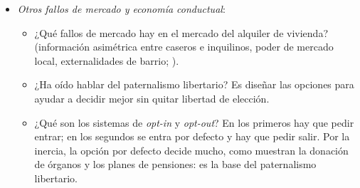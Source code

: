 \documentclass[11pt]{article}
\begin{document}
\begin{itemize}
\begin{itemize}
  \item ¿Por qué la DMA designa a los guardianes con umbrales en lugar de definir mercados?
  \item ¿Qué relación hay entre la regulación y las nuevas tecnologías? (plataformas, datos, DMA).
  \item ¿Cómo se evalúa una regulación? (análisis coste-beneficio e impacto normativo; los 5~criterios de legitimidad del anexo~\ref{anexo:buena-regulacion}) .
  \end{itemize}
\item \emph{Otros fallos de mercado y economía conductual}:
  \begin{itemize}
  \item ¿Qué fallos de mercado hay en el mercado del alquiler de vivienda? (información asimétrica entre caseros e inquilinos, poder de mercado local, externalidades de barrio;  ).
  \item ¿Ha oído hablar del paternalismo libertario? Es diseñar las opciones para ayudar a decidir mejor sin quitar libertad de elección\nocite{ThalerSunstein2003Libertarian}.
  \item ¿Qué son los sistemas de \emph{opt-in} y \emph{opt-out}? En los primeros hay que pedir entrar; en los segundos se entra por defecto y hay que pedir salir. Por la inercia, la opción por defecto decide mucho, como muestran la donación de órganos\nocite{JohnsonGoldstein2003Defaults} y los planes de pensiones\nocite{MadrianShea2001Power}: es la base del paternalismo libertario.
  \end{itemize}
\end{itemize}

\nocite{ViscusiHarringtonVernon2005Economics,BaldwinCaveLodge2012Understanding,ArmstrongCowanVickers1994Regulatory}

\bibliografia
\end{document}
